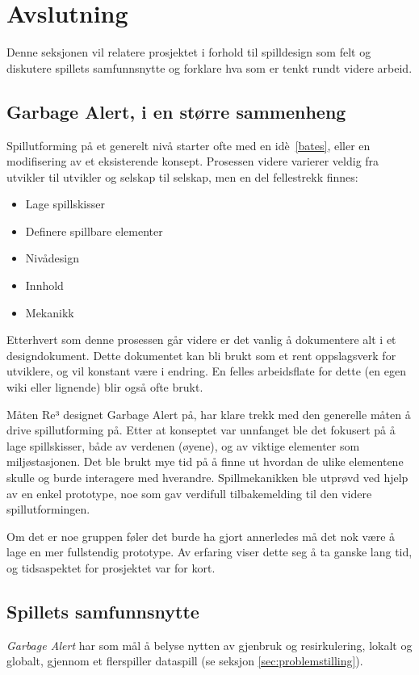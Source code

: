 \section{Avslutning}\label{sec:conclusion}
Denne seksjonen vil relatere prosjektet i forhold til spilldesign som
felt og diskutere spillets samfunnsnytte og forklare hva som er tenkt
rundt videre arbeid.

\subsection{Garbage Alert, i en større sammenheng}
Spillutforming på et generelt nivå starter ofte med en idè~\ref{bates},
eller en modifisering av et eksisterende konsept. Prosessen videre
varierer veldig fra utvikler til utvikler og selskap til selskap, men en
del fellestrekk finnes:
\begin{itemize}
\item Lage spillskisser
\item Definere spillbare elementer
\item Nivådesign
\item Innhold
\item Mekanikk
\end{itemize}
Etterhvert som denne prosessen går videre er det vanlig å dokumentere
alt i et designdokument. Dette dokumentet kan bli brukt som et rent
oppslagsverk for utviklere, og vil konstant være i endring. En felles
arbeidsflate for dette (en egen wiki eller lignende) blir også ofte brukt.

Måten Re³ designet Garbage Alert på, har klare trekk med den generelle
måten å drive spillutforming på. Etter at konseptet var unnfanget ble
det fokusert på å lage spillskisser, både av verdenen (øyene), og av
viktige elementer som miljøstasjonen. Det ble brukt mye tid på å finne
ut hvordan de ulike elementene skulle og burde interagere med hverandre.
Spillmekanikken ble utprøvd ved hjelp av en enkel prototype, noe som gav
verdifull tilbakemelding til den videre spillutformingen.

Om det er noe gruppen føler det burde ha gjort annerledes må det nok
være å lage en mer fullstendig prototype. Av erfaring viser dette seg å
ta ganske lang tid, og tidsaspektet for prosjektet var for kort.

\subsection{Spillets samfunnsnytte}
\emph{Garbage Alert} har som mål å belyse nytten av gjenbruk og resirkulering, lokalt og globalt, gjennom et flerspiller dataspill (se seksjon \ref{sec:problemstilling}).

